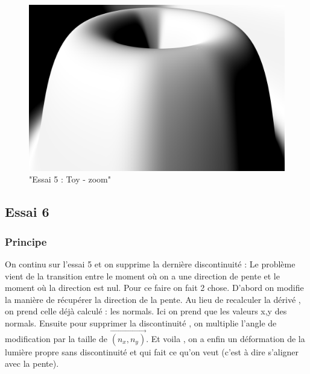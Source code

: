 \documentclass[a4paper]{article}
\begin{document}
\begin{figure}[thb]
	\centering
    \includegraphics[scale=0.3]{Images/Essais/Essai_5_toy_zoom.png}
    \caption{"Essai 5 : Toy  - zoom"}
 \end{figure}
 
 \subsection{Essai 6}
\subsubsection{Principe}
On continu sur l'essai 5 et on supprime la dernière discontinuité : 
Le problème vient de la transition entre le moment où on a une direction de pente et le moment où la direction est nul. Pour ce faire on fait 2 chose. D'abord on modifie la manière de récupérer la direction de la pente. Au lieu de recalculer la dérivé , on prend celle déjà calculé : les normals. Ici on prend que les valeurs x,y des normals.
Ensuite pour supprimer la discontinuité , on multiplie l'angle de modification par la taille de $\vec{(n_x,n_y)}$.
Et voila , on a enfin un déformation de la lumière propre sans discontinuité et qui fait ce qu'on veut (c'est à dire s'aligner avec la pente). 
\end{document}
